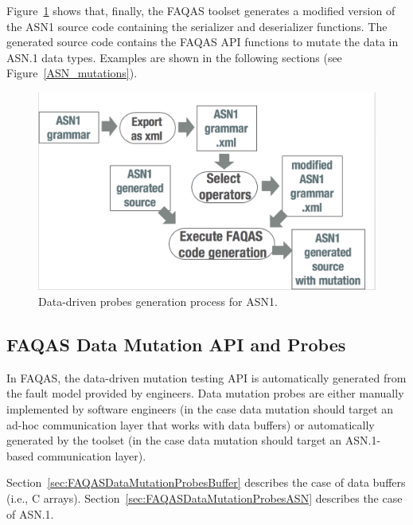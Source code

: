 

Figure~\ref{fig:ASN1ProbesGeneration} shows that, finally, the FAQAS toolset generates a modified version of the ASN1 source code containing the serializer and deserializer functions. The generated source code contains the FAQAS API functions to mutate the data in ASN.1 data types. Examples are shown in the following sections (see Figure~\ref{ASN_mutations}).

\begin{figure}[h]
  \centering
    \includegraphics[width=12cm]{images/ASN1mutationProces}
      \caption{Data-driven probes generation process for ASN1.}
      \label{fig:ASN1ProbesGeneration}
\end{figure}








\clearpage
\subsection{FAQAS Data Mutation API and Probes}
\label{sec:FAQASDataMutationProbes}

In FAQAS, the data-driven mutation testing API is automatically generated from the fault model provided by engineers. Data mutation probes are either manually implemented by software engineers (in the case data mutation should target an ad-hoc communication layer that works with data buffers) or automatically generated by the toolset (in the case data mutation should target an ASN.1-based communication layer).

Section~\ref{sec:FAQASDataMutationProbesBuffer} describes the case of data buffers (i.e., C arrays).
Section~\ref{sec:FAQASDataMutationProbesASN} describes the case of ASN.1.


